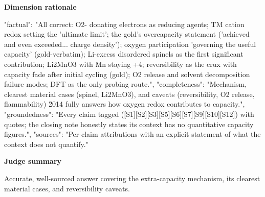 \documentclass[10pt]{article}
\begin{document}
\textbf{Dimension rationale}
\begin{EvidenceText}
{
  "factual": "All correct: O2- donating electrons as reducing agents; TM cation redox setting the 'ultimate limit'; the gold's overcapacity statement ('achieved and even exceeded... charge density'); oxygen participation 'governing the useful capacity' (gold-verbatim); Li-excess disordered spinels as the first significant contribution; Li2MnO3 with Mn staying +4; reversibility as the crux with capacity fade after initial cycling (gold); O2 release and solvent decomposition failure modes; DFT as the only probing route.",
  "completeness": "Mechanism, clearest material cases (spinel, Li2MnO3), and caveats (reversibility, O2 release, flammability) \u2014 fully answers how oxygen redox contributes to capacity.",
  "groundedness": "Every claim tagged ([S1][S2][S3][S5][S6][S7][S9][S10][S12]) with quotes; the closing note honestly states its context has no quantitative capacity figures.",
  "sources": "Per-claim attributions with an explicit statement of what the context does not quantify."
}
\end{EvidenceText}

\textbf{Judge summary}
\begin{EvidenceText}
Accurate, well-sourced answer covering the extra-capacity mechanism, its clearest material cases, and reversibility caveats.
\end{EvidenceText}
\end{document}
